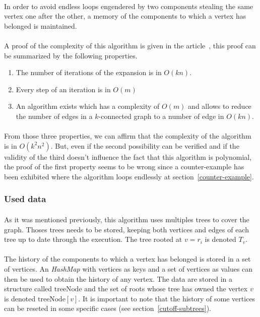 \paragraph{}
In order to avoid endless loops engendered by two components stealing the same
vertex one after the other, a memory of the components to which a vertex has
belonged is maintained.
\paragraph{}
A proof of the complexity of this algorithm is given in the
article~\cite{JS94}, this proof can be summarized by the following properties.
\begin{enumerate}
\item The number of iterations of the expansion is in $O(kn)$.
\item Every step of an iteration is in $O(m)$
\item An algorithm exists which has a complexity of $O(m)$ and allows to
  reduce the number of edges in a $k$-connected graph to a number of edge in
  $O(kn)$.
\end{enumerate}
\paragraph{}
From those three properties, we can affirm that the complexity of the
algorithm is in $O(k^2n^2)$. But, even if the second possibility can be
verified and if the validity of the third doesn't influence the fact that this
algorithm is polynomial, the proof of the first property seems to be wrong
since a counter-example has been exhibited where the algorithm loops endlessly
at section~\ref{counter-example}.

\subsubsection{Used data}
\paragraph{}
As it was mentioned previously, this algorithm uses multiples trees to cover
the graph. Thoses trees needs to be stored, keeping both vertices and edges of
each tree up to date through the execution. The tree rooted at $v = r_i$ is
denoted $T_v$.
\paragraph{}
The history of the components to which a vertex has belonged is stored in a
set of vertices. An {\em HashMap} with vertices as keys and a set of vertices
as values can then be used to obtain the history of any vertex. The data are
stored in a structure called $\mathrm{treeNode}$ and the set of roots whose
tree has owned the vertex $v$ is denoted $\mathrm{treeNode}[v]$. It is
important to note that the history of some vertices can be reseted in some
specific cases (see section~\ref{cutoff-subtrees}).
